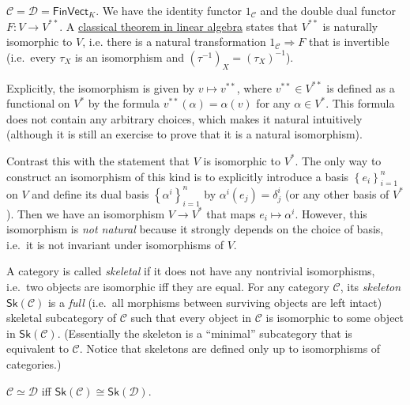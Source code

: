 \documentclass[english,letterpaper]{article}%
\numberwithin{equation}{section}
\numberwithin{figure}{section}
\numberwithin{table}{section}
\theoremstyle{definition}
\theoremstyle{definition}
\theoremstyle{definition}
\theoremstyle{plain}
\theoremstyle{plain}
\theoremstyle{plain}
\theoremstyle{plain}
\theoremstyle{remark}
\theoremstyle{remark}
\begin{document}
\begin{example}
$\mathcal{C}=\mathcal{D}=\mathsf{FinVect}_{K}$. We have the identity
functor $1_{\mathcal{C}}$ and the double dual functor $F:V\to V^{\ast\ast}$.
A \href{https://en.wikipedia.org/wiki/Dual_space\#Double_dual}{classical theorem in linear algebra}
states that $V^{\ast\ast}$ is naturally isomorphic to $V$, i.e.
there is a natural transformation $1_{\mathcal{C}}\Longrightarrow F$
that is invertible (i.e.\ every $\tau_{X}$ is an isomorphism and $\left(\tau^{-1}\right)_{X}=\left(\tau_{X}\right)^{-1}$).

Explicitly, the isomorphism is given by $v\mapsto v^{\ast\ast}$,
where $v^{\ast\ast}\in V^{\ast\ast}$ is defined as a functional on
$V^{\ast}$ by the formula $v^{\ast\ast}\left(\alpha\right)=\alpha\left(v\right)$
for any $\alpha\in V^{\ast}$. This formula does not contain any arbitrary
choices, which makes it natural intuitively (although it is still an exercise to prove that it is a natural isomorphism).

Contrast this with the statement that $V$ is isomorphic to $V^{\ast}$.
The only way to construct an isomorphism of this kind is to explicitly introduce
a basis $\left\{ e_{i}\right\} _{i=1}^{n}$ on $V$ and define its
dual basis $\left\{ \alpha^{i}\right\} _{i=1}^{n}$ by $\alpha^{i}\left(e_{j}\right)=\delta_{j}^{i}$ (or any other basis of $V^\ast$).
Then we have an isomorphism $V\to V^{\ast}$ that maps $e_{i}\mapsto\alpha^{i}$.
However, this isomorphism is \emph{not natural} because it strongly
depends on the choice of basis, i.e.\ it is not invariant under isomorphisms
of $V$.
\end{example}
%
\begin{defn}[Skeleton]
A category is called \emph{skeletal} if it does not have any nontrivial
isomorphisms, i.e.\ two objects are isomorphic iff they are equal.
For any category $\mathcal{C}$, its \emph{skeleton} $\mathsf{Sk}\left(\mathcal{C}\right)$
is a \emph{full} (i.e.\ all morphisms between surviving objects are left intact) skeletal subcategory
of $\mathcal{C}$ such that every object in $\mathcal{C}$ is isomorphic
to some object in $\mathsf{Sk}\left(\mathcal{C}\right)$. (Essentially
the skeleton is a ``minimal'' subcategory that is equivalent to
$\mathcal{C}$. Notice that skeletons are defined only up to isomorphisms
of categories.)
\end{defn}
\begin{prop}
$\mathcal{C}\simeq\mathcal{D}$ iff $\mathsf{Sk}\left(\mathcal{C}\right)\cong\mathsf{Sk}\left(\mathcal{D}\right)$.
\end{prop}
\end{document}
